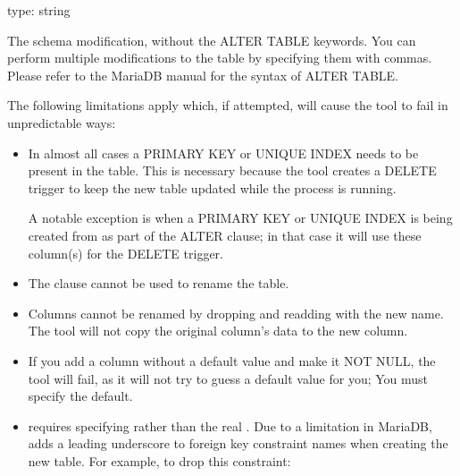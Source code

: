 \documentclass[letterpaper,10pt,english]{sphinxmanual}
\begin{document}
\begin{fulllineitems}
\label{\detokenize{mariadb-schema-change:cmdoption-mariadb-schema-change-alter}}
\sphinxAtStartPar
type: string

\sphinxAtStartPar
The schema modification, without the ALTER TABLE keywords. You can perform
multiple modifications to the table by specifying them with commas. Please refer
to the MariaDB manual for the syntax of ALTER TABLE.

\sphinxAtStartPar
The following limitations apply which, if attempted, will cause the tool
to fail in unpredictable ways:
\begin{itemize}
\item {} 
\sphinxAtStartPar
In almost all cases a PRIMARY KEY or UNIQUE INDEX needs to be present in the table.
This is necessary because the tool creates a DELETE trigger to keep the new table
updated while the process is running.

\sphinxAtStartPar
A notable exception is when a PRIMARY KEY or UNIQUE INDEX is being created from
 as part of the ALTER clause; in that case it will use these
column(s) for the DELETE trigger.

\item {} 
\sphinxAtStartPar
The  clause cannot be used to rename the table.

\item {} 
\sphinxAtStartPar
Columns cannot be renamed by dropping and re\sphinxhyphen{}adding with the new name.
The tool will not copy the original column’s data to the new column.

\item {} 
\sphinxAtStartPar
If you add a column without a default value and make it NOT NULL, the tool
will fail, as it will not try to guess a default value for you; You must
specify the default.

\item {} 
\sphinxAtStartPar
{} requires specifying 
rather than the real .  Due to a limitation in MariaDB,
 adds a leading underscore to foreign key constraint
names when creating the new table.  For example, to drop this constraint:


\end{itemize}
\end{fulllineitems}
\end{document}
